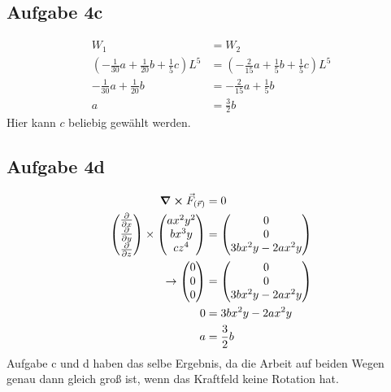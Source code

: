 \documentclass[a4paper,10pt]{extarticle}
\begin{document}
\subsection*{Aufgabe 4c}
\begin{align*}
W_1 &= W_2 \\
\left(-\frac{1}{30}a + \frac{1}{20}b + \frac{1}{5}c\right)L^5 &= \left(-\frac{2}{15}a + \frac{1}{5}b + \frac{1}{5}c\right)L^5 \\ 
- \frac{1}{30}a + \frac{1}{20}b &= - \frac{2}{15}a + \frac{1}{5}b \\
a &= \frac{3}{2}b
\end{align*}
Hier kann $c$ beliebig gewählt werden.

\subsection*{Aufgabe 4d}
\begin{align*}
\curl \vec{F}_{(\vec{r})} &= 0 \\
\mqty( \pdv{}{x} \\ \pdv{}{y} \\ \pdv{}{z}) \times \mqty(ax^2y^2 \\ bx^3y \\ cz^4) &= \mqty(0 \\ 0 \\ 3bx^2y - 2ax^2y) \\
\rightarrow \mqty(0 \\ 0 \\ 0) &= \mqty(0 \\ 0 \\ 3bx^2y - 2ax^2y) \\
0 &= 3bx^2y - 2ax^2y \\
a &= \frac{3}{2}b
\end{align*}
Aufgabe c und d haben das selbe Ergebnis, da die Arbeit auf beiden Wegen genau dann gleich groß ist, wenn das Kraftfeld keine Rotation hat.
\end{document}
